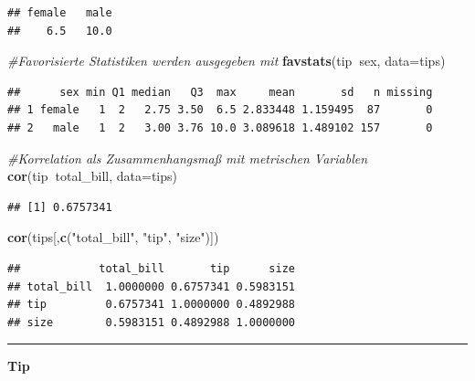 \documentclass[10pt,ngerman,onside]{article}
\newenvironment{Shaded}{\begin{snugshade}}{\end{snugshade}}
\newcommand{\KeywordTok}[1]{\textcolor[rgb]{0.13,0.29,0.53}{\textbf{#1}}}
\newcommand{\DataTypeTok}[1]{\textcolor[rgb]{0.13,0.29,0.53}{#1}}
\newcommand{\StringTok}[1]{\textcolor[rgb]{0.31,0.60,0.02}{#1}}
\newcommand{\CommentTok}[1]{\textcolor[rgb]{0.56,0.35,0.01}{\textit{#1}}}
\newcommand{\OperatorTok}[1]{\textcolor[rgb]{0.81,0.36,0.00}{\textbf{#1}}}
\newcommand{\NormalTok}[1]{#1}
\begin{document}
\begin{verbatim}
## female   male 
##    6.5   10.0
\end{verbatim}

\begin{Shaded}
\begin{Highlighting}[]
\CommentTok{#Favorisierte Statistiken werden ausgegeben mit}
\KeywordTok{favstats}\NormalTok{(tip}\OperatorTok{~}\NormalTok{sex, }\DataTypeTok{data=}\NormalTok{tips)}
\end{Highlighting}
\end{Shaded}

\begin{verbatim}
##      sex min Q1 median   Q3  max     mean       sd   n missing
## 1 female   1  2   2.75 3.50  6.5 2.833448 1.159495  87       0
## 2   male   1  2   3.00 3.76 10.0 3.089618 1.489102 157       0
\end{verbatim}

\begin{Shaded}
\begin{Highlighting}[]
\CommentTok{#Korrelation als Zusammenhangsmaß mit metrischen Variablen}
\KeywordTok{cor}\NormalTok{(tip}\OperatorTok{~}\NormalTok{total_bill, }\DataTypeTok{data=}\NormalTok{tips)}
\end{Highlighting}
\end{Shaded}

\begin{verbatim}
## [1] 0.6757341
\end{verbatim}

\begin{Shaded}
\begin{Highlighting}[]
\KeywordTok{cor}\NormalTok{(tips[,}\KeywordTok{c}\NormalTok{(}\StringTok{"total_bill"}\NormalTok{, }\StringTok{"tip"}\NormalTok{, }\StringTok{"size"}\NormalTok{)])}
\end{Highlighting}
\end{Shaded}

\begin{verbatim}
##            total_bill       tip      size
## total_bill  1.0000000 0.6757341 0.5983151
## tip         0.6757341 1.0000000 0.4892988
## size        0.5983151 0.4892988 1.0000000
\end{verbatim}

\begin{center}\rule{0.5\linewidth}{\linethickness}\end{center}

\textbf{Tip}
\end{document}
